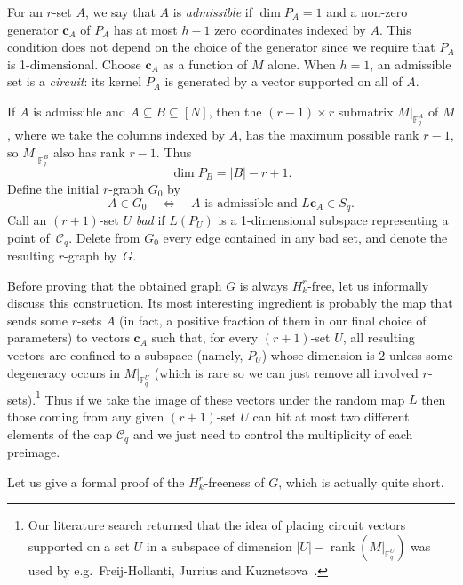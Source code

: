 \documentclass[10pt,a4paper]{article}
\numberwithin{equation}{section}
\theoremstyle{definition}
\theoremstyle{remark}
\newcommand{\V}[1]{\boldsymbol{#1}}
\begin{document}
For an $r$-set $A$, we say that $A$ is \emph{admissible} if $\dim P_A=1$ and a non-zero generator $\V{c}_A$ of $P_A$ has at most $h-1$ zero coordinates indexed by $A$. This condition does not depend on the choice of the generator since we require that $P_A$ is 1-dimensional. Choose $\V{c}_A$ as a function of $M$ alone. When $h=1$, an admissible set is a \emph{circuit}: its kernel $P_A$ is generated by a vector supported on all of $A$.

If $A$ is admissible and $A\subseteq B\subseteq[N]$, then the $(r-1)\times r$ submatrix $M|_{\mathbb F_q^A}$ of $M$, where we take the columns indexed by $A$, has the maximum possible rank $r-1$, so $M|_{\mathbb F_q^B}$ also has rank $r-1$. Thus
\begin{equation}\label{eq:poisson-kernel-dimension}
	\dim P_B=|B|-r+1.
\end{equation}
Define the initial $r$-graph $G_0$ by
\begin{equation*}
	A\in G_0\quad\Longleftrightarrow\quad
	A\text{ is admissible and }L\V{c}_A\in S_q.
\end{equation*}
Call an $(r+1)$-set $U$ \emph{bad} if $L(P_U)$ is a 1-dimensional subspace representing a point of~$\mathcal C_q$. Delete from $G_0$ every edge contained in any bad set, and denote the resulting $r$-graph by~$G$.

Before proving that the obtained graph $G$ is always $H_k^r$-free, let us informally discuss this construction. Its most interesting ingredient is probably the map that sends some $r$-sets $A$ (in fact, a positive fraction of them in our final choice of parameters) to vectors $\V{c}_A$ such that, for every $(r+1)$-set $U$, all resulting vectors are confined  to a subspace (namely, $P_U$) whose dimension is $2$ unless some degeneracy occurs in $M|_{\mathbb F_q^U}$ (which is rare so we can just remove all involved $r$-sets).\footnote{Our literature search returned that the idea of placing circuit vectors supported on a set $U$  in a subspace of dimension $|U|-\operatorname{rank}(M|_{\mathbb F_q^U})$ was used by e.g.\ Freij-Hollanti, Jurrius and Kuznetsova~\cite[Eqs.~(1)--(2)]{FreijHollantiJurriusKuznetsova23}.}
Thus if we take the image of these vectors under the random map $L$ then those coming from any given $(r+1)$-set $U$ can hit at most two different elements of the cap $\mathcal C_q$ and we just need to control the multiplicity of each preimage. 

Let us give a formal proof of the $H_k^r$-freeness of $G$, which is actually quite short.
\end{document}
